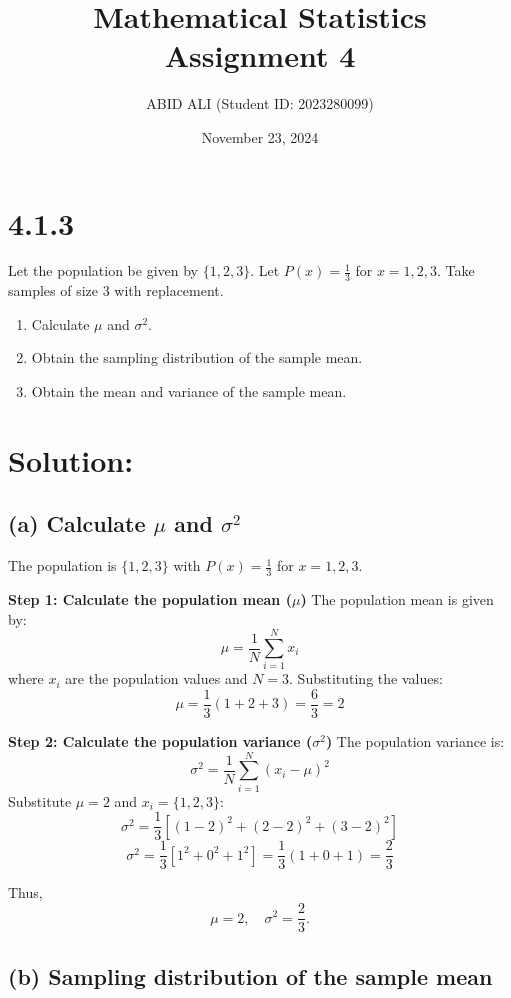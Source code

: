 \documentclass{article}
\title{Mathematical Statistics Assignment 4}
\author{ABID ALI (Student ID: 2023280099)}
\date{November 23, 2024}
\begin{document}
\maketitle

\newpage %

\section*{4.1.3}

Let the population be given by $\{1, 2, 3\}$. Let $P(x) = \frac{1}{3}$ for $x = 1, 2, 3$. Take samples of size 3 with replacement.

\begin{enumerate}
    \item[(a)] Calculate $\mu$ and $\sigma^2$.
    \item[(b)] Obtain the sampling distribution of the sample mean.
    \item[(c)] Obtain the mean and variance of the sample mean.
\end{enumerate}

\section*{Solution:}


\subsection*{(a) Calculate $\mu$ and $\sigma^2$}

The population is $\{1, 2, 3\}$ with $P(x) = \frac{1}{3}$ for $x = 1, 2, 3$.

\textbf{Step 1: Calculate the population mean ($\mu$)}  
The population mean is given by:
\[
\mu = \frac{1}{N} \sum_{i=1}^N x_i
\]
where $x_i$ are the population values and $N = 3$. Substituting the values:
\[
\mu = \frac{1}{3} (1 + 2 + 3) = \frac{6}{3} = 2
\]

\textbf{Step 2: Calculate the population variance ($\sigma^2$)}  
The population variance is:
\[
\sigma^2 = \frac{1}{N} \sum_{i=1}^N (x_i - \mu)^2
\]
Substitute $\mu = 2$ and $x_i = \{1, 2, 3\}$:
\[
\sigma^2 = \frac{1}{3} \left[(1 - 2)^2 + (2 - 2)^2 + (3 - 2)^2 \right]
\]
\[
\sigma^2 = \frac{1}{3} \left[1^2 + 0^2 + 1^2\right] = \frac{1}{3} (1 + 0 + 1) = \frac{2}{3}
\]

Thus, 
\[
\mu = 2, \quad \sigma^2 = \frac{2}{3}.
\]

\subsection*{(b) Sampling distribution of the sample mean}
\end{document}

